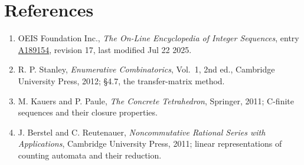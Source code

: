 \documentclass[11pt]{article}
\theoremstyle{definition}
\begin{document}
\section{References}

\begin{enumerate}

\item OEIS Foundation Inc., \emph{The On-Line Encyclopedia of Integer Sequences}, entry \href{https://oeis.org/A189154}{A189154}, revision 17, last modified Jul 22 2025.

\item R. P. Stanley, \emph{Enumerative Combinatorics}, Vol.~1, 2nd ed., Cambridge University Press, 2012; \S4.7, the transfer-matrix method.

\item M. Kauers and P. Paule, \emph{The Concrete Tetrahedron}, Springer, 2011; C-finite sequences and their closure properties.

\item J. Berstel and C. Reutenauer, \emph{Noncommutative Rational Series with Applications}, Cambridge University Press, 2011; linear representations of counting automata and their reduction.

\end{enumerate}
\end{document}
